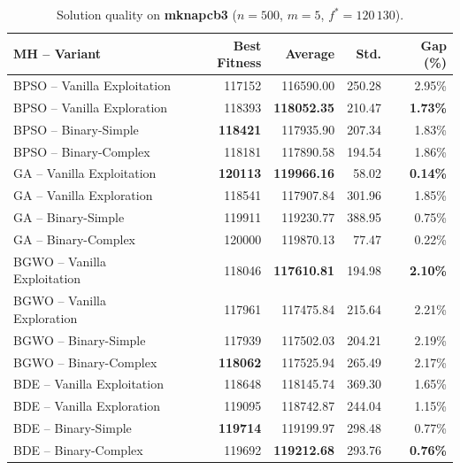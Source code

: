 \documentclass[journal,article,submit,moreauthors]{Definitions/mdpi}
\begin{document}
\begin{table}[htbp]
  \centering
  \small
  \caption{Solution quality on \textbf{mknapcb3}
  ($n=500$, $m=5$, $f^*=120\,130$).}
  \label{tab:calidad_mknapcb3}
  \begin{tabular}{lrrrr}
    \toprule
    \textbf{MH -- Variant} &
    \textbf{Best Fitness} &
    \textbf{Average} &
    \textbf{Std.} &
    \textbf{Gap (\%)} \\
    \midrule
    BPSO -- Vanilla Exploitation & 117152 & 116590.00 & 250.28 & 2.95\% \\
    BPSO -- Vanilla Exploration  & 118393 & \textbf{118052.35} & 210.47 & \textbf{1.73\%} \\
    BPSO -- Binary-Simple        & \textbf{118421} & 117935.90 & 207.34 & 1.83\% \\
    BPSO -- Binary-Complex       & 118181 & 117890.58 & 194.54 & 1.86\% \\
    \midrule
    GA -- Vanilla Exploitation   & \textbf{120113} & \textbf{119966.16} & 58.02 & \textbf{0.14\%} \\
    GA -- Vanilla Exploration    & 118541 & 117907.84 & 301.96 & 1.85\% \\
    GA -- Binary-Simple          & 119911 & 119230.77 & 388.95 & 0.75\% \\
    GA -- Binary-Complex         & 120000 & 119870.13 & 77.47 & 0.22\% \\
    \midrule
    BGWO -- Vanilla Exploitation & 118046 & \textbf{117610.81} & 194.98 & \textbf{2.10\%} \\
    BGWO -- Vanilla Exploration  & 117961 & 117475.84 & 215.64 & 2.21\% \\
    BGWO -- Binary-Simple        & 117939 & 117502.03 & 204.21 & 2.19\% \\
    BGWO -- Binary-Complex       & \textbf{118062} & 117525.94 & 265.49 & 2.17\% \\
    \midrule
    BDE -- Vanilla Exploitation  & 118648 & 118145.74 & 369.30 & 1.65\% \\
    BDE -- Vanilla Exploration   & 119095 & 118742.87 & 244.04 & 1.15\% \\
    BDE -- Binary-Simple         & \textbf{119714} & 119199.97 & 298.48 & 0.77\% \\
    BDE -- Binary-Complex        & 119692 & \textbf{119212.68} & 293.76 & \textbf{0.76\%} \\
    \bottomrule
  \end{tabular}
\end{table}
\end{document}
